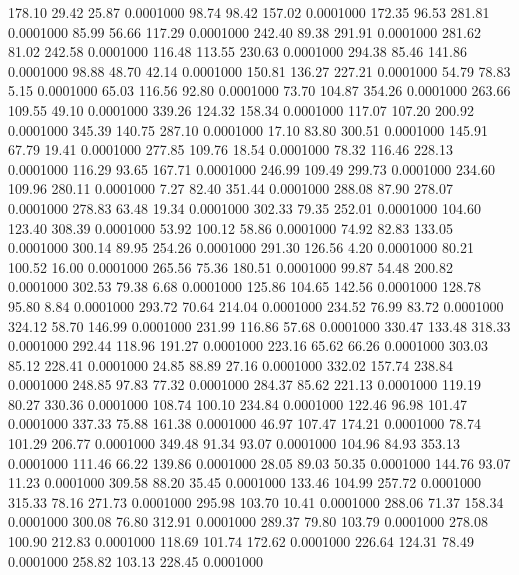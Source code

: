  178.10   29.42   25.87   0.0001000
  98.74   98.42  157.02   0.0001000
 172.35   96.53  281.81   0.0001000
  85.99   56.66  117.29   0.0001000
 242.40   89.38  291.91   0.0001000
 281.62   81.02  242.58   0.0001000
 116.48  113.55  230.63   0.0001000
 294.38   85.46  141.86   0.0001000
  98.88   48.70   42.14   0.0001000
 150.81  136.27  227.21   0.0001000
  54.79   78.83    5.15   0.0001000
  65.03  116.56   92.80   0.0001000
  73.70  104.87  354.26   0.0001000
 263.66  109.55   49.10   0.0001000
 339.26  124.32  158.34   0.0001000
 117.07  107.20  200.92   0.0001000
 345.39  140.75  287.10   0.0001000
  17.10   83.80  300.51   0.0001000
 145.91   67.79   19.41   0.0001000
 277.85  109.76   18.54   0.0001000
  78.32  116.46  228.13   0.0001000
 116.29   93.65  167.71   0.0001000
 246.99  109.49  299.73   0.0001000
 234.60  109.96  280.11   0.0001000
   7.27   82.40  351.44   0.0001000
 288.08   87.90  278.07   0.0001000
 278.83   63.48   19.34   0.0001000
 302.33   79.35  252.01   0.0001000
 104.60  123.40  308.39   0.0001000
  53.92  100.12   58.86   0.0001000
  74.92   82.83  133.05   0.0001000
 300.14   89.95  254.26   0.0001000
 291.30  126.56    4.20   0.0001000
  80.21  100.52   16.00   0.0001000
 265.56   75.36  180.51   0.0001000
  99.87   54.48  200.82   0.0001000
 302.53   79.38    6.68   0.0001000
 125.86  104.65  142.56   0.0001000
 128.78   95.80    8.84   0.0001000
 293.72   70.64  214.04   0.0001000
 234.52   76.99   83.72   0.0001000
 324.12   58.70  146.99   0.0001000
 231.99  116.86   57.68   0.0001000
 330.47  133.48  318.33   0.0001000
 292.44  118.96  191.27   0.0001000
 223.16   65.62   66.26   0.0001000
 303.03   85.12  228.41   0.0001000
  24.85   88.89   27.16   0.0001000
 332.02  157.74  238.84   0.0001000
 248.85   97.83   77.32   0.0001000
 284.37   85.62  221.13   0.0001000
 119.19   80.27  330.36   0.0001000
 108.74  100.10  234.84   0.0001000
 122.46   96.98  101.47   0.0001000
 337.33   75.88  161.38   0.0001000
  46.97  107.47  174.21   0.0001000
  78.74  101.29  206.77   0.0001000
 349.48   91.34   93.07   0.0001000
 104.96   84.93  353.13   0.0001000
 111.46   66.22  139.86   0.0001000
  28.05   89.03   50.35   0.0001000
 144.76   93.07   11.23   0.0001000
 309.58   88.20   35.45   0.0001000
 133.46  104.99  257.72   0.0001000
 315.33   78.16  271.73   0.0001000
 295.98  103.70   10.41   0.0001000
 288.06   71.37  158.34   0.0001000
 300.08   76.80  312.91   0.0001000
 289.37   79.80  103.79   0.0001000
 278.08  100.90  212.83   0.0001000
 118.69  101.74  172.62   0.0001000
 226.64  124.31   78.49   0.0001000
 258.82  103.13  228.45   0.0001000

